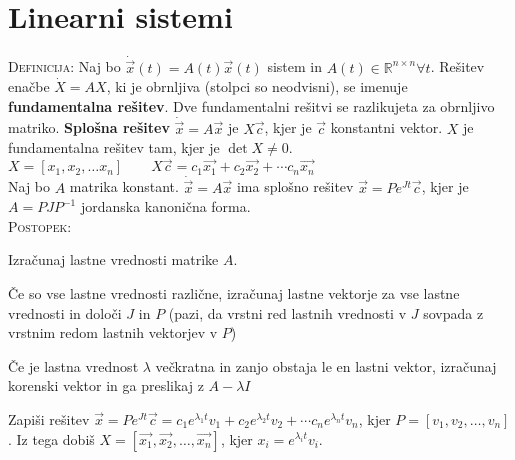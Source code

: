 \documentclass[8pt,a4paper]{amsart}
\theoremstyle{definition} %
\theoremstyle{plain} %
\newenvironment{itemize*}%
{
\begin{itemize}
\setlength{\itemsep}{0pt}
\setlength{\parskip}{1pt}
}
{\end{itemize}}
\newenvironment{enumerate*}%
{
\begin{enumerate}
\setlength{\itemsep}{0pt}
\setlength{\parskip}{1pt}
}
{\end{enumerate}}
\newcommand{\R}{\mathbb R}
\begin{document}
\thispagestyle{empty}
\setlength{\parindent}{0pt}
\section*{\textbf{Linearni sistemi}} %

\textsc{Definicija: }Naj bo $\dot{\vec{x}}(t) = A(t) \vec{x}(t)$ sistem in $A(t)
\in \R^{n \times n} \forall t$. Rešitev enačbe $\dot{X} = AX$, ki je obrnljiva (stolpci so neodvisni),
se imenuje \textbf{fundamentalna rešitev}. Dve fundamentalni rešitvi se
razlikujeta za obrnljivo matriko. \textbf{Splošna rešitev}
$\dot{\vec{x}} = A \vec{x}$ je $X\vec{c}$, kjer je $\vec{c}$ konstantni vektor.  $X$ je fundamentalna rešitev tam, kjer je $\det{X} \neq 0.$\\

\vspace{-0.3cm}
$X = [x_1,x_2,\ldots x_n] \qquad X\vec{c} = c_1\vec{x_1} + c_2\vec{x_2} + \cdots
c_n\vec{x_n}$ \\

\vspace{-0.3cm}
Naj bo $A$ matrika konstant. $\dot{\vec{x}} = A \vec{x}$ ima splošno rešitev
$\vec{x} = Pe^{Jt}\vec{c}$, kjer je $A=PJP^{-1}$ jordanska kanonična forma.  \\

\vspace{-0.3cm}
\textsc{Postopek:}
\begin{enumerate*}
  \item Izračunaj lastne vrednosti
    matrike $A$.
    \begin{itemize*}
      \item Če so vse lastne vrednosti različne,
        izračunaj lastne vektorje za vse lastne vrednosti in določi $J$ in $P$ (pazi,
        da vrstni red lastnih vrednosti v $J$ sovpada z vrstnim redom lastnih vektorjev
        v $P$)
      \item Če je lastna vrednost $\lambda$ večkratna in zanjo obstaja le en
        lastni vektor, izračunaj korenski vektor in ga preslikaj z $A-\lambda I$
    \end{itemize*}
  \item Zapiši rešitev $\vec{x} = Pe^{Jt}\vec{c} = c_1
    e^{\lambda_1t} v_1 + c_2 e^{\lambda_2t} v_2 + \cdots c_n e^{\lambda_nt} v_n$,
    kjer $P = [v_1,v_2,\ldots ,v_n]$. Iz tega dobiš $X = [\vec{x_1},\vec{x_2},
    \ldots, \vec{x_n}]$, kjer $x_i = e^{\lambda_it} v_i$.
\end{enumerate*}
\end{document}
